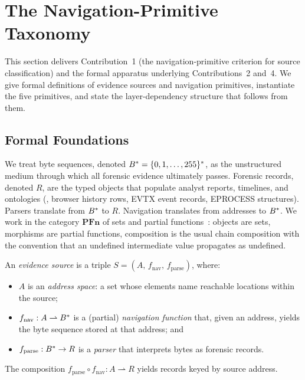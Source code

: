 \section{The Navigation-Primitive Taxonomy}
\label{sec:taxonomy}

This section delivers Contribution~1 (the navigation-primitive criterion for
source classification) and the formal apparatus underlying Contributions~2
and~4. We give formal definitions of evidence sources and navigation
primitives, instantiate the five primitives, and state the layer-dependency
structure that follows from them.

\subsection{Formal Foundations}

We treat byte sequences, denoted $B^{*} = \{0,1,\ldots,255\}^{*}$, as the
unstructured medium through which all forensic evidence ultimately passes.
Forensic records, denoted $R$, are the typed objects that populate analyst
reports, timelines, and ontologies (\eg{}, browser history rows, EVTX event
records, EPROCESS structures). Parsers translate from $B^{*}$ to $R$.
Navigation translates from addresses to $B^{*}$. We work in the category
$\mathbf{PFn}$ of sets and partial functions~\cite{maclane1998categories}:
objects are sets, morphisms are partial functions, composition is the usual
chain composition with the convention that an undefined intermediate value
propagates as undefined.

\begin{definition}
\label{def:source}
An \emph{evidence source} is a triple $S = (A,\, f_{\mathrm{nav}},\,
f_{\mathrm{parse}})$, where:
\begin{itemize}
    \item $A$ is an \emph{address space}: a set whose elements name reachable
    locations within the source;
    \item $f_{\mathrm{nav}} : A \rightharpoonup B^{*}$ is a (partial)
    \emph{navigation function} that, given an address, yields the byte
    sequence stored at that address; and
    \item $f_{\mathrm{parse}} : B^{*} \to R$ is a \emph{parser} that
    interprets bytes as forensic records.
\end{itemize}
The composition $f_{\mathrm{parse}} \circ f_{\mathrm{nav}} : A \rightharpoonup R$
yields records keyed by source address.
\end{definition}

